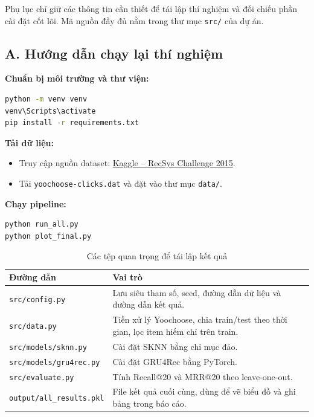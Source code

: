 \documentclass[12pt, a4paper]{article}
\begin{document}
Phụ lục chỉ giữ các thông tin cần thiết để tái lập thí nghiệm và đối chiếu phần cài đặt cốt lõi. Mã nguồn đầy đủ nằm trong thư mục \texttt{src/} của dự án.

\subsection*{A. Hướng dẫn chạy lại thí nghiệm}

\textbf{Chuẩn bị môi trường và thư viện:}

\begin{lstlisting}[language=bash, caption={Các lệnh chuẩn bị môi trường}]
python -m venv venv
venv\Scripts\activate
pip install -r requirements.txt
\end{lstlisting}

\textbf{Tải dữ liệu:}
\begin{itemize}[topsep=0pt]
    \item Truy cập nguồn dataset: \href{https://www.kaggle.com/datasets/chadgostopp/recsys-challenge-2015}{Kaggle -- RecSys Challenge 2015}.
    \item Tải \texttt{yoochoose-clicks.dat} và đặt vào thư mục \texttt{data/}.
\end{itemize}

\textbf{Chạy pipeline:}

\begin{lstlisting}[language=bash, caption={Các lệnh chạy thí nghiệm và vẽ biểu đồ}]
python run_all.py
python plot_final.py
\end{lstlisting}

\begin{table}[H]
\centering
\caption{Các tệp quan trọng để tái lập kết quả}
\label{tab:appendix_files}
\begin{tabularx}{\textwidth}{@{}lX@{}}
\toprule
\textbf{Đường dẫn} & \textbf{Vai trò} \\
\midrule
\texttt{src/config.py} & Lưu siêu tham số, seed, đường dẫn dữ liệu và đường dẫn kết quả. \\
\texttt{src/data.py} & Tiền xử lý Yoochoose, chia train/test theo thời gian, lọc item hiếm chỉ trên train. \\
\texttt{src/models/sknn.py} & Cài đặt SKNN bằng chỉ mục đảo. \\
\texttt{src/models/gru4rec.py} & Cài đặt GRU4Rec bằng PyTorch. \\
\texttt{src/evaluate.py} & Tính Recall@20 và MRR@20 theo leave-one-out. \\
\texttt{output/all\_results.pkl} & File kết quả cuối cùng, dùng để vẽ biểu đồ và ghi bảng trong báo cáo. \\
\bottomrule
\end{tabularx}
\end{table}
\end{document}
